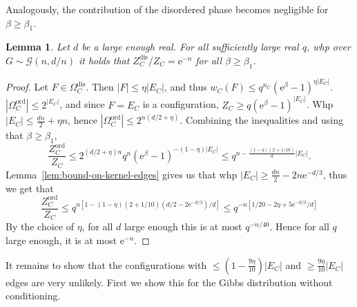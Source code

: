 \documentclass[11pt]{article}
\theoremstyle{plain}
\newtheorem{lemma}[theorem]{Lemma}
\newcommand{\G}{\mathcal{G}}
\newcommand{\emm}{\mathrm{e}}
\newcommand{\1}{\mathbb{1}}
\newcommand{\ord}{\mathrm{ord}}
\newcommand{\dis}{\mathrm{dis}}
\begin{document}
Analogously, the contribution of the disordered phase becomes negligible for \(\beta \geq \beta_1\).

\begin{lemma}\label{lem:disordered-phase-vanishes}
    Let \(d\) be a large enough real. For all sufficiently large real \(q\), whp over \(G\sim\G(n,d/n)\) it holds that \(Z^\dis_C / Z_C = \emm^{-n}\) for all \(\beta \geq \beta_1\).
\end{lemma}
\begin{proof}
    Let \(F\in\Omega^\dis_C\). Then \(|F|\leq\eta |E_C|\), and thus \(w_C(F)\leq q^{n_C} (\emm^\beta-1)^{\eta |E_C|}\). \(|\Omega^\ord_C| \leq 2^{|E_C|}\), and since \(F=E_C\) is a configuration, \(Z_C\geq q(\emm^\beta-1)^{|E_C|}\). Whp \(|E_C|\leq \frac{dn}{2} + \eta n\), hence \(|\Omega^\ord_C|\leq 2^{n(d/2 + \eta)}\). Combining the inequalities and using that \(\beta\geq\beta_1\),
    \[
    \frac{Z^\ord_C}{Z_C}\leq 2^{(d/2+\eta)n} q^{n}(\emm^\beta-1)^{-(1-\eta)|E_C|} \leq q^{n - \frac{(1-\eta)(2+1/10)}{d}|E_C|}.
    \]
    Lemma~\ref{lem:bound-on-kernel-edges} gives us that whp \(|E_C|\geq\frac{dn}{2}-2n\emm^{-d/3}\), thus we get that
    \[
    \frac{Z^\ord_C}{Z_C} \leq q^{n[1-(1-\eta)(2+1/10)(d/2 - 2\emm^{-d/3})/d]} \leq q^{-n[1/20 - 2\eta+5\emm^{-d/3}/d]}
    \]
    By the choice of \(\eta\), for all \(d\) large enough this is at most \(q^{-n/40}\). Hence for all \(q\) large enough, it is at most \(\emm^{-n}\).
\end{proof}

It remains to show that the configurations with \(\leq(1-\tfrac{9\eta}{10})|E_C|\) and \(\geq \tfrac{9\eta}{10}|E_C|\) edges are very unlikely. First we show this for the Gibbs distribution without conditioning.
\end{document}
